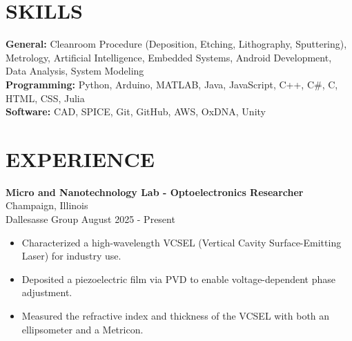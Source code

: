 \documentclass[a4paper,12pt]{extarticle}
\begin{document}
\section*{SKILLS}
    \textbf{General:} Cleanroom Procedure (Deposition, Etching, Lithography, 
    Sputtering), Metrology,
    Artificial Intelligence, 
    Embedded Systems, Android Development, Data Analysis, 
    System Modeling 
    \\
    \textbf{Programming:} Python, Arduino, MATLAB, Java, JavaScript, C++, C\#, C, HTML, CSS, Julia %
    \\
    \textbf{Software:} CAD, SPICE, Git, GitHub, AWS, OxDNA, Unity %




\section*{EXPERIENCE}

\noindent
\textbf{Micro and Nanotechnology Lab - Optoelectronics Researcher}
\hfill Champaign, Illinois \\
Dallesasse Group  \hfill August 2025 - Present 

\begin{itemize}[topsep=0pt]
\itemindent=-13pt

\item Characterized a high-wavelength VCSEL (Vertical Cavity Surface-Emitting Laser)
for industry use.

\item Deposited a piezoelectric film via PVD to enable voltage-dependent phase adjustment.

\item Measured the refractive index and thickness of the VCSEL with both an ellipsometer and a Metricon.
\end{itemize}
\end{document}

